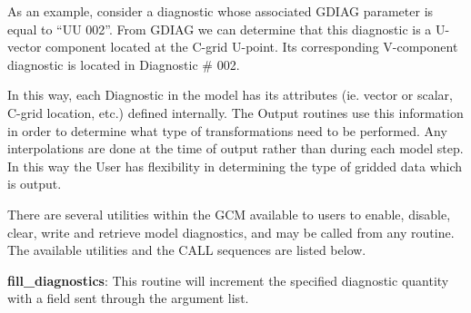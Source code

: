 \noindent
As an example, consider a diagnostic whose associated GDIAG parameter is equal
to ``UU  002''.  From GDIAG we can determine that this diagnostic is a 
U-vector component located at the C-grid U-point.
Its corresponding V-component diagnostic is located in Diagnostic \# 002.


\noindent
In this way, each Diagnostic in the model has its attributes (ie. vector or scalar,
C-grid location, etc.) defined internally.  The Output routines use this information 
in order to determine what type of transformations need to be performed.  Any 
interpolations are done at the time of output rather than during each model step.
In this way the User has flexibility in determining the type of gridded data which 
is output.


\noindent
There are several utilities within the GCM available to users to enable, disable,
clear, write and retrieve model diagnostics, and may be called from any routine.  
The available utilities and the CALL sequences are listed below.


\noindent
{\bf fill\_diagnostics}:  This routine will increment the specified diagnostic
quantity with a field sent through the argument list.


